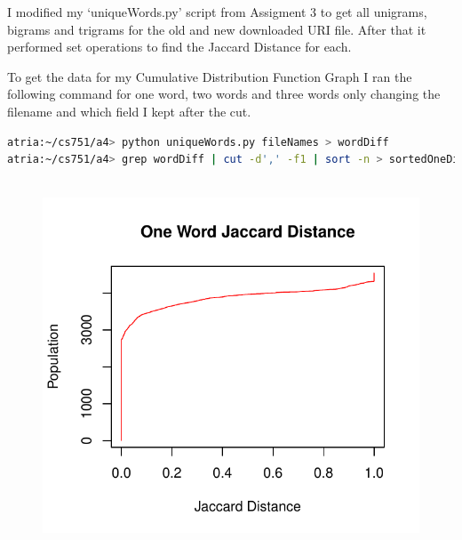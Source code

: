 \documentclass[12pt]{article}
\begin{document}
I modified my `uniqueWords.py' script from Assigment 3 to get all unigrams, bigrams and trigrams for the old and new downloaded URI file. After that it performed set operations to find the Jaccard Distance for each.

To get the data for my Cumulative Distribution Function Graph I ran the following command for one word, two words and three words only changing the filename and which field I kept after the cut.

\begin{lstlisting}[language=bash]
atria:~/cs751/a4> python uniqueWords.py fileNames > wordDiff
atria:~/cs751/a4> grep wordDiff | cut -d',' -f1 | sort -n > sortedOneDiff
\end{lstlisting}

\begin{figure}[H]
    \centering
    \includegraphics[scale=0.7]{oneDiff.pdf}
\end{figure}
\end{document}
